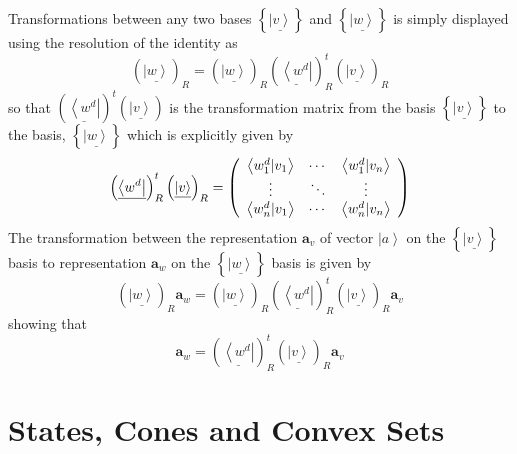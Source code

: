 \documentclass[aps,preprint]{revtex4}%
\begin{document}
Transformations between any two bases $\left\{  \underline{\left\vert
v\right\rangle }\right\}  $ and $\left\{  \underline{\left\vert w\right\rangle
}\right\}  $ is simply displayed using the resolution of the identity as
\begin{equation}
\left(  \underline{\left\vert w\right\rangle }\right)  _{R}=\left(
\underline{\left\vert w\right\rangle }\right)  _{R}\left(  \underline
{\left\langle w^{d}\right\vert }\right)  _{R}^{t}\left(  \underline{\left\vert
v\right\rangle }\right)  _{R}%
\end{equation}
so that $\left(  \underline{\left\langle w^{d}\right\vert }\right)
^{t}\left(  \underline{\left\vert v\right\rangle }\right)  $ is the
transformation matrix from the basis $\left\{  \underline{\left\vert
v\right\rangle }\right\}  $ to the basis, $\left\{  \underline{\left\vert
w\right\rangle }\right\}  $ which is explicitly given by
\begin{equation}
\left(  \underline{\left\langle w^{d}\right\vert }\right)  _{R}^{t}\left(
\underline{\left\vert v\right\rangle }\right)  _{R}=\left(
\begin{array}
[c]{ccc}%
\left\langle w_{1}^{d}|v_{1}\right\rangle  & \cdots & \left\langle w_{1}%
^{d}|v_{n}\right\rangle \\
\vdots & \ddots & \vdots\\
\left\langle w_{n}^{d}|v_{1}\right\rangle  & \cdots & \left\langle w_{n}%
^{d}|v_{n}\right\rangle
\end{array}
\right)
\end{equation}
The transformation between the representation $\mathbf{a}_{v}$ of vector
$\left\vert a\right\rangle $ on the $\left\{  \underline{\left\vert
v\right\rangle }\right\}  $ basis to representation $\mathbf{a}_{w}$ on the
$\left\{  \underline{\left\vert w\right\rangle }\right\}  $ basis is given by%
\begin{equation}
\left(  \underline{\left\vert w\right\rangle }\right)  _{R}\mathbf{a}%
_{w}=\left(  \underline{\left\vert w\right\rangle }\right)  _{R}\left(
\underline{\left\langle w^{d}\right\vert }\right)  _{R}^{t}\left(
\underline{\left\vert v\right\rangle }\right)  _{R}\mathbf{a}_{v}%
\end{equation}
showing that
\begin{equation}
\mathbf{a}_{w}=\left(  \underline{\left\langle w^{d}\right\vert }\right)
_{R}^{t}\left(  \underline{\left\vert v\right\rangle }\right)  _{R}%
\mathbf{a}_{v}%
\end{equation}


\section{States, Cones and Convex Sets\label{states}}
\end{document}
